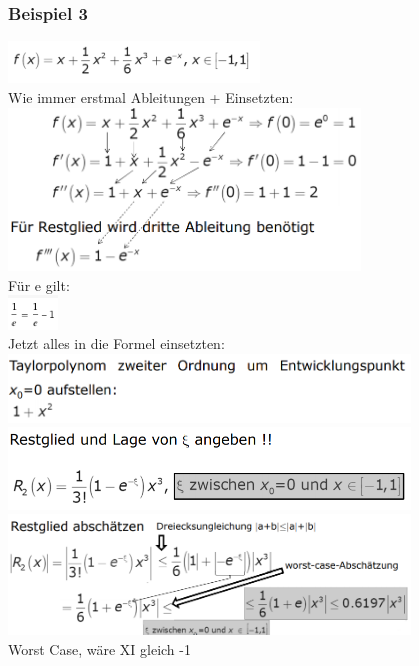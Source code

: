 \documentclass[12pt,a4paper]{article}
\begin{document}
\subsubsection{Beispiel 3}
\includegraphics[width=0.5\textwidth]{Bilder/V1/29.png}\\
Wie immer erstmal Ableitungen + Einsetzten:\\
\includegraphics[width=0.7\textwidth]{Bilder/V1/30.png}\\
Für e gilt:\\
\includegraphics[width=0.1\textwidth]{Bilder/V1/31.png}\\
Jetzt alles in die Formel einsetzten:\\
\includegraphics[width=0.8\textwidth]{Bilder/V1/32.png}\\
\includegraphics[width=0.8\textwidth]{Bilder/V1/33.png}\\
\includegraphics[width=0.8\textwidth]{Bilder/V1/34.png}\\
Worst Case, wäre XI gleich -1\\
\end{document}
